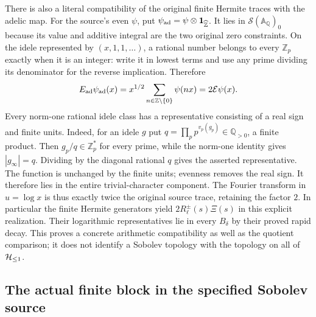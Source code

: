 There is also a literal compatibility of the original finite Hermite
traces with the adelic map. For the source's even $\psi$, put
$\psi_{\rm ad}=\psi\otimes\mathbf1_{\widehat{\mathbb Z}}$.
It lies in $\mathcal S(\mathbb A_{\mathbb Q})_0$ because its value
and additive integral are the two original zero constraints.
On the idele represented by $(x,1,1,\ldots)$, a rational number
belongs to every $\mathbb Z_p$ exactly when it is an integer:
write it in lowest terms and use any prime dividing its denominator
for the reverse implication. Therefore
\[
 E_{\rm ad}\psi_{\rm ad}(x)
   =x^{1/2}\sum_{n\in\mathbb Z\setminus\{0\}}\psi(nx)
   =2\mathcal E\psi(x).
\]
Every norm-one rational idele class has a representative consisting
of a real sign and finite units. Indeed, for an idele $g$ put
$q=\prod_p p^{v_p(g_p)}\in\mathbb Q_{>0}$, a finite product.
Then $g_p/q\in\mathbb Z_p^*$ for every prime, while the
norm-one identity gives $|g_\infty|=q$. Dividing by the diagonal
rational $q$ gives the asserted representative. The function
is unchanged by the finite units; evenness removes the real sign.
It therefore lies in the entire trivial-character component.
The Fourier transform in $u=\log x$ is thus exactly twice the
original source trace, retaining the factor $2$. In particular the
finite Hermite generators yield $2R_\ell^\pm(s)\Xi(s)$ in this
explicit realization. Their logarithmic representatives lie in
every $B_\delta$ by their proved rapid decay. This proves a concrete
arithmetic compatibility as well as the quotient comparison; it
does not identify a Sobolev topology with the topology on all of
$\mathcal H_{\leq 1}$.


\subsection{The actual finite block in the specified Sobolev source}

